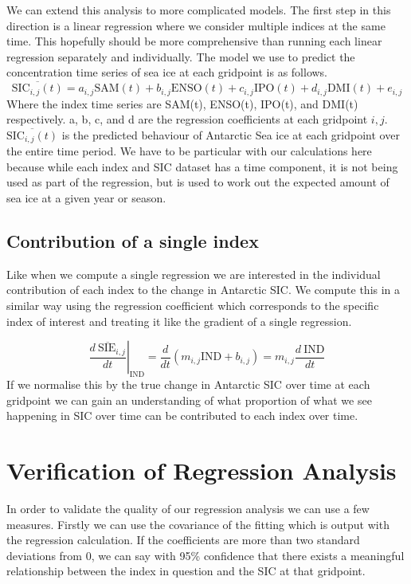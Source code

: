 We can extend this analysis to more complicated models. The first step in this direction is a linear regression where we consider multiple indices at the same time. This hopefully should be more comprehensive than running each linear regression separately and individually. The model we use to predict the concentration time series of sea ice at each gridpoint is as follows.
$$
\overline{\text{SIC}_{i,j}\left(t\right)} = a_{i,j} \text{SAM}\left(t\right) + b_{i,j} \text{ENSO}\left(t\right) + c_{i,j} \text{IPO}\left(t\right)+ d_{i,j} \text{DMI}\left(t\right) + e_{i,j}
$$
Where the index time series are SAM(t), ENSO(t), IPO(t), and DMI(t) respectively. a, b, c, and d are the regression coefficients at each gridpoint $i, j$. $\overline{\text{SIC}_{i,j}\left(t\right)}$ is the predicted behaviour of Antarctic Sea ice at each gridpoint over the entire time period. We have to be particular with our calculations here because while each index and SIC dataset has a time component, it is not being used as part of the regression, but is used to work out the expected amount of sea ice at a given year or season.

\subsection{Contribution of a single index}
Like when we compute a single regression we are interested in the individual contribution of each index to the change in Antarctic SIC. We compute this in a similar way using the regression coefficient which corresponds to the specific index of interest and treating it like the gradient of a single regression.

$$
\left. \overline{\frac{d\  \text{SIE}_{i,j}}{dt}}\right|_{\text{IND}} = \frac{d}{dt} \left(m_{i,j}  \text{IND} + b_{i,j}\right) = m_{i,j}  \frac{d\ \text{IND}}{dt}
$$
 If we normalise this by the true change in Antarctic SIC over time at each gridpoint we can gain an understanding of what proportion of what we see happening in SIC over time can be contributed to each index over time.
 
\section{Verification of Regression Analysis}

In order to validate the quality of our regression analysis we can use a few measures. Firstly we can use the covariance of the fitting which is output with the regression calculation. If the coefficients are more than two standard deviations from 0, we can say with 95\% confidence that there exists a meaningful relationship between the index in question and the SIC at that gridpoint. 

